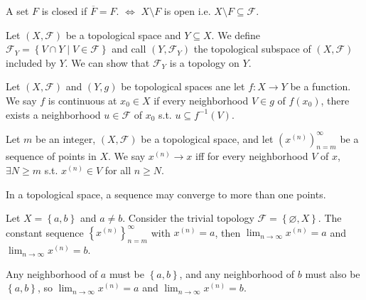 \begin{corollary}
    A set \(F\) is closed if \(\overline{F} = F\). \(\iff \) \(X \setminus F\) is open i.e. \(X \setminus F \subseteq \mathcal{F} \).     
\end{corollary} 

\begin{definition}
    Let \((X, \mathcal{F} )\)  be a topological space and \(Y \subseteq X\). We define \(\mathcal{F} _Y = \left\{ V \cap Y \mid V \in \mathcal{F}  \right\} \) and call \((Y, \mathcal{F} _Y)\) the topological subspace of \((X, \mathcal{F} )\) included by \(Y\). We can show that \(\mathcal{F} _Y\) is a topology on \(Y\).       
\end{definition}

\begin{definition}
    Let \((X, \mathcal{F} )\) and \((Y, g)\) be topological spaces ane let \(f:X \to  Y\) be a function. We say \(f\) is continuous at \(x_0 \in X\) if every neighborhood \(V \in g\) of \(f(x_0)\), there exists a neighborhood \(u \in \mathcal{F} \) of \(x_0\) s.t. \(u \subseteq f^{-1}(V)\).          
\end{definition}

\begin{definition}[Convergence]
    Let \(m\) be an integer, \((X, \mathcal{F} )\) be a topological space, and let \(\left( x^{(n)} \right)_{n=m}^{\infty}  \) be a sequence of points in \(X\). We say \(x^{(n)} \to x\) iff for every neighborhood \(V\) of \(x\), \(\exists N \ge m\) s.t. \(x^{(n)} \in V\) for all \(n \ge N\).          
\end{definition}

\begin{remark}
    In a topological space, a sequence may converge to more than one points. 
\end{remark}

\begin{eg}
    Let \(X = \left\{ a, b \right\} \) and \(a \neq b\). Consider the trivial topology \(\mathcal{F} = \left\{ \varnothing , X \right\} \). The constant sequence \(\left\{ x^{(n)} \right\}_{n=m}^{\infty}  \) with \(x^{(n)} = a\), then \(\lim_{n \to \infty} x^{(n)} = a \) and \(\lim_{n \to \infty} x^{(n)} = b \).      
\end{eg}

\begin{explanation}
    Any neighborhood of \(a\) must be \(\left\{ a, b \right\} \), and any neighborhood of \(b\) must also be \(\left\{ a, b \right\} \), so \(\lim_{n \to \infty} x^{(n)} = a \) and \(\lim_{n \to \infty}  x^{(n)} = b\).     
\end{explanation}


